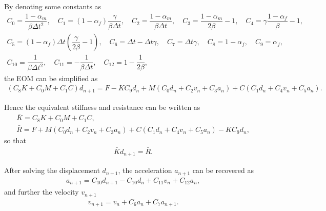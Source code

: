 \documentclass[a4paper,10pt,fleqn]{article}
\begin{document}
By denoting some constants as
\begin{gather*}
C_0=\dfrac{1-\alpha_m}{\beta\Delta{}t^2},\quad
C_1=\left(1-\alpha_f\right)\dfrac{\gamma{}}{\beta\Delta{}t},\quad
C_2=\dfrac{1-\alpha_m}{\beta\Delta{}t},\quad
C_3=\dfrac{1-\alpha_m}{2\beta}-1,\quad
C_4=\gamma\dfrac{1-\alpha_f}{\beta}-1,\\
C_5=\left(1-\alpha_f\right)\Delta{}t\left(\dfrac{\gamma}{2\beta}-1\right),\quad
C_6=\Delta{}t-\Delta{}t\gamma,\quad
C_7=\Delta{}t\gamma{},\quad
C_8=1-\alpha_f,\quad
C_9=\alpha_f,\\
C_{10}=\dfrac{1}{\beta\Delta{}t^2},\quad
C_{11}=-\dfrac{1}{\beta\Delta{}t},\quad
C_{12}=1-\dfrac{1}{2\beta},
\end{gather*}
the EOM can be simplified as
\begin{gather}
\left(C_8K+C_0M+C_1C\right)d_{n+1}=F-KC_9d_n+M\left(C_0d_n+C_2v_n+C_3a_n\right)+C\left(C_1d_n+C_4v_n+C_5a_n\right).
\end{gather}

Hence the equivalent stiffness and resistance can be written as
\begin{gather}
\bar{K}=C_8K+C_0M+C_1C,\\
\bar{R}=F+M\left(C_0d_n+C_2v_n+C_3a_n\right)+C\left(C_1d_n+C_4v_n+C_5a_n\right)-KC_9d_n,
\end{gather}
so that
\begin{gather}
\bar{K}d_{n+1}=\bar{R}.
\end{gather}

After solving the displacement $d_{n+1}$, the acceleration $a_{n+1}$ can be recovered as
\begin{gather}
a_{n+1}=C_{10}d_{n+1}-C_{10}d_n+C_{11}v_n+C_{12}a_n,
\end{gather}
and further the velocity $v_{n+1}$
\begin{gather}
v_{n+1}=v_n+C_6a_n+C_7a_{n+1}.
\end{gather}
\end{document}
